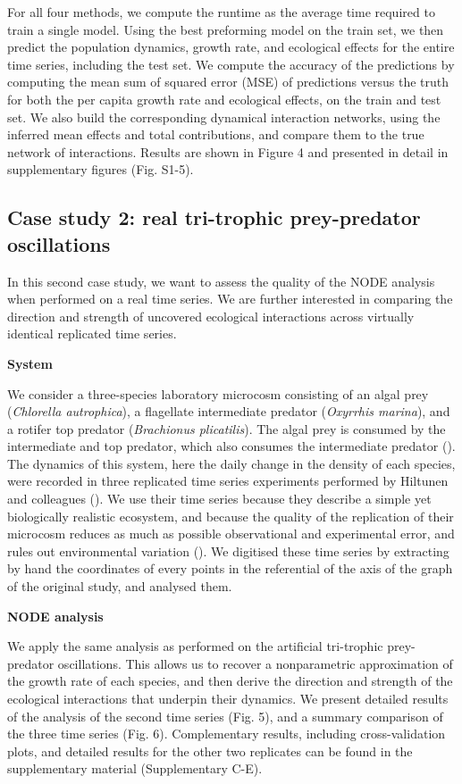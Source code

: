 \documentclass[11pt, oneside]{article}
\begin{document}
For all four methods, we compute the runtime as the average time required to train a single model.
Using the best preforming model on the train set, we then predict the population dynamics, growth rate, and ecological effects for the entire time series, including the test set.
We compute the accuracy of the predictions by computing the mean sum of squared error (MSE) of predictions versus the truth for both the per capita growth rate and ecological effects, on the train and test set.
We also build the corresponding dynamical interaction networks, using the inferred mean effects and total contributions, and compare them to the true network of interactions.
Results are shown in Figure 4 and presented in detail in supplementary figures (Fig. S1-5).

\subsection{Case study 2: real tri-trophic prey-predator oscillations}

In this second case study, we want to assess the quality of the NODE analysis when performed on a real time series.
We are further interested in comparing the direction and strength of uncovered ecological interactions across virtually identical replicated time series.

\textbf{System}

We consider a three-species laboratory microcosm consisting of an algal prey (\textit{Chlorella autrophica}), a flagellate intermediate predator (\textit{Oxyrrhis marina}), and a rotifer top predator (\textit{Brachionus plicatilis}).
The algal prey is consumed by the intermediate and top predator, which also consumes the intermediate predator (\cite{Arndt1993}).
The dynamics of this system, here the daily change in the density of each species, were recorded in three replicated time series experiments performed by Hiltunen and colleagues (\cite{Hiltunen2013}). 
We use their time series because they describe a simple yet biologically realistic ecosystem, and because the quality of the replication of their microcosm reduces as much as possible observational and experimental error, and rules out environmental variation (\cite{Hiltunen2013}).
We digitised these time series by extracting by hand the coordinates of every points in the referential of the axis of the graph of the original study, and analysed them.

\textbf{NODE analysis}

We apply the same analysis as performed on the artificial tri-trophic prey-predator oscillations.
This allows us to recover a nonparametric approximation of the growth rate of each species, and then derive the direction and strength of the ecological interactions that underpin their dynamics.
We present detailed results of the analysis of the second time series (Fig. 5), and a summary comparison of the three time series (Fig. 6).
Complementary results, including cross-validation plots, and detailed results for the other two replicates can be found in the supplementary material (Supplementary C-E).
\end{document}

